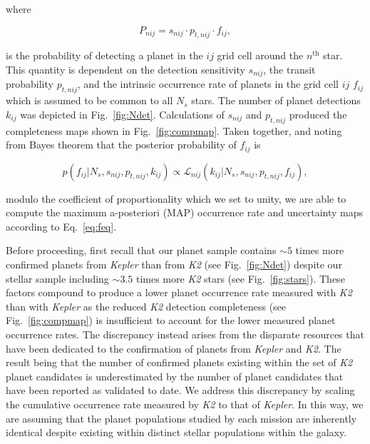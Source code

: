 \documentclass[twocolumn]{emulateapj}
\newcommand{\kepler}[1]{\emph{Kepler}#1}
\newcommand{\ktwo}[1]{\emph{K2}#1}
\begin{document}
\noindent where

\begin{equation}
  P_{nij} = s_{nij} \cdot p_{t,nij} \cdot f_{ij},
  \label{eq:prob}
\end{equation}

\noindent is the probability of detecting a planet in the $ij$ grid cell around the $n^{\text{th}}$ star.
This quantity is dependent on the detection sensitivity $s_{nij}$, the transit probability $p_{t,nij}$, and the 
intrinsic occurrence rate of planets in the grid cell $ij$ $f_{ij}$ which is assumed to be common to all
$N_s$ stars.
The number of planet detections $k_{ij}$ was depicted in Fig.~\ref{fig:Ndet}.
Calculations of $s_{nij}$ and $p_{t,nij}$ produced the completeness maps shown in Fig.~\ref{fig:compmap}. 
Taken together, and noting from Bayes theorem that the posterior probability of $f_{ij}$ is 

\begin{equation}
  p(f_{ij}|N_s,s_{nij},p_{t,nij},k_{ij}) \propto \mathcal{L}_{nij}(k_{ij}|N_s,s_{nij},p_{t,nij},f_{ij}),
  \label{eq:feq}
\end{equation}
  
\noindent modulo the coefficient of proportionality which we set to unity, we are able to compute
the maximum a-posteriori (MAP) occurrence rate and uncertainty maps according to Eq.~\ref{eq:feq}.

Before proceeding, first recall that our planet sample contains $\sim 5$ times more confirmed planets
from \kepler{} than from \ktwo{} 
(see Fig.~\ref{fig:Ndet}) despite our stellar sample including $\sim 3.5$ times more \ktwo{} stars 
(see Fig.~\ref{fig:stars}). These factors compound to produce a lower planet occurrence rate measured
with \ktwo{} than with \kepler{} as the reduced \ktwo{} detection completeness %
(see Fig.~\ref{fig:compmap}) is insufficient to account for the lower measured
planet occurrence rates. The discrepancy instead arises from the disparate resources that have
been dedicated to the confirmation of planets from \kepler{} and \ktwo{.} The result being that
the number of confirmed planets existing within the set of \ktwo{} planet candidates is underestimated
by the number of planet candidates that have been reported as validated to date. We address this discrepancy
by scaling the cumulative occurrence rate measured by \ktwo{} to that of \kepler{.}
In this way, we are assuming that the planet populations studied by each mission are inherently
identical despite existing within distinct stellar populations within the galaxy.
\end{document}
